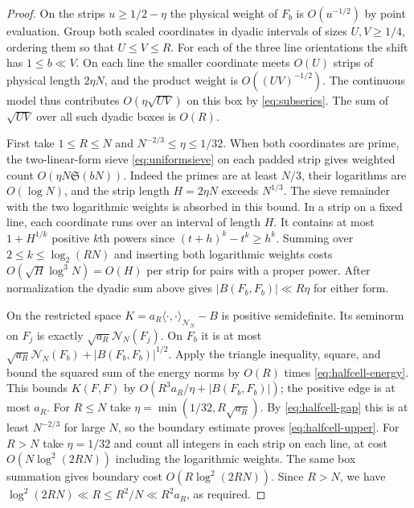 \documentclass[11pt,a4paper]{article}
\numberwithin{equation}{section}
\newcommand{\SSS}{\mathfrak S}
\newcommand{\NN}{\mathcal N_N}
\begin{document}
\begin{proof}
On the strips $u\ge1/2-\eta$ the physical weight of $F_b$ is
$O(u^{-1/2})$ by point evaluation. Group both scaled coordinates
in dyadic intervals of sizes $U,V\ge1/4$, ordering them so that
$U\le V\le R$. For each of the three line orientations the shift
has $1\le b\ll V$. On each line the smaller coordinate meets
$O(U)$ strips of physical length $2\eta N$, and the product
weight is $O((UV)^{-1/2})$. The continuous model thus contributes
$O(\eta\sqrt{UV})$ on this box by \eqref{eq:subseries}.
The sum of $\sqrt{UV}$ over all such dyadic boxes is $O(R)$.

First take $1\le R\le N$ and $N^{-2/3}\le\eta\le1/32$. When both
coordinates are prime, the two-linear-form sieve
\eqref{eq:uniformsieve} on each padded strip gives weighted
count $O(\eta N\SSS(bN))$. Indeed the primes are at
least $N/3$, their logarithms are $O(\log N)$, and the strip
length $H=2\eta N$ exceeds $N^{1/3}$. The sieve remainder with
the two logarithmic weights is absorbed in this bound. In a
strip on a fixed line, each coordinate runs over an interval of
length $H$. It contains at most $1+H^{1/k}$ positive $k$th
powers since $(t+h)^k-t^k\ge h^k$. Summing over
$2\le k\le\log_2(RN)$ and inserting both logarithmic weights
costs $O(\sqrt H\log^3 N)=O(H)$ per strip for pairs with a
proper power. After normalization the dyadic sum above gives
$|B(F_b,F_b)|\ll R\eta$ for either form.

On the restricted space $K=a_R\langle\cdot,\cdot\rangle_{\NN}-B$
is positive semidefinite. Its seminorm on $F_j$ is exactly
$\sqrt{a_R}\NN(F_j)$. On $F_b$ it is at most
$\sqrt{a_R}\NN(F_b)+|B(F_b,F_b)|^{1/2}$. Apply the triangle
inequality, square, and bound the squared sum of the energy norms
by $O(R)$ times \eqref{eq:halfcell-energy}. This bounds $K(F,F)$
by $O(R^3a_R/\eta+|B(F_b,F_b)|)$; the positive edge is at most
$a_R$. For $R\le N$ take $\eta=\min(1/32,R\sqrt{a_R})$.
By \eqref{eq:halfcell-gap} this is at least $N^{-2/3}$ for
large $N$, so the boundary estimate proves \eqref{eq:halfcell-upper}.
For $R>N$ take $\eta=1/32$ and count all integers in each strip
on each line, at cost $O(N\log^2(2RN))$ including the
logarithmic weights. The same box summation gives boundary cost
$O(R\log^2(2RN))$. Since $R>N$, we have
$\log^2(2RN)\ll R\le R^2/N\ll R^2a_R$, as required.


\end{proof}
\end{document}
